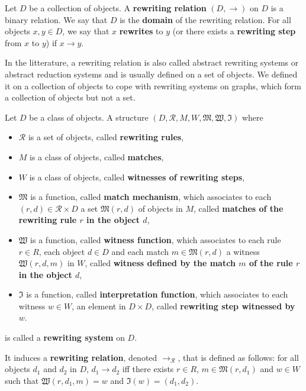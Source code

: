 \begin{definition}
  \label{def:ars}
  Let $D$ be a collection of objects.
  A \textbf{rewriting relation} $(D, \rightarrow)$ on $D$ is a binary relation.
   We say that $D$ is the \textbf{domain} of the rewriting relation. For all objects $x,y\in D$, we say that $x$ \textbf{rewrites} to $y$ (or there exists a \textbf{rewriting step} from $x$ to $y$) if $x \mathop{\rightarrow} y$.
\end{definition}
 
In the litterature, a rewriting relation is also called abstract rewriting systems or abstract reduction systems \cite{nipkow1998term,terese2003term} and is usually defined on a set of objects. We defined it on a collection of objects to cope with rewriting systems on graphs, which form a collection of objects but not a set.
 
\begin{definition}
  \label{def:rewriting_system_no_framework}
  Let $D$ be a class of objects. 
  A structure $(D, \mathcal{R},M,W,\mathfrak{M},\mathfrak{W},\mathfrak{I})$ where 
  \begin{itemize}
    \item $\mathcal{R}$ is a set of objects, called \textbf{rewriting rules}, 
    \item $M$ is a class of objects, called \textbf{matches}, 
    \item $W$ is a class of objects, called \textbf{witnesses of rewriting steps},  
    \item $\mathfrak{M}$ is a function, called \textbf{match mechanism}, which associates to each $(r,d) \mathop{\in} \mathcal{R} \mathop{\times} D$ a set $\mathfrak{M}(r,d)$ of objects in $M$, called \textbf{matches of the rewriting rule $r$ in the object $d$},
    \item $\mathfrak{W}$ is a function, called \textbf{witness function}, which associates to each rule $r \mathop{\in} R$, 
        each object $d \mathop{\in} D$ and each match $m \mathop{\in} \mathfrak{M}(r,d)$ 
        a witness $\mathfrak{W}(r,d,m)$ in $W$, 
        called \textbf{witness defined by the match $m$ of the rule $r$ in the object $d$},
    \item $\mathfrak{I}$ is a function, called \textbf{interpretation function},  
        which associates to each witness $w \mathop{\in} W$, an element 
        in $D \mathop{\times} D$, called \textbf{rewriting step witnessed by $w$}.
  \end{itemize}
   is called a \textbf{rewriting system} on $D$.
   
   It induces a \textbf{rewriting relation}, denoted $\rightarrow_\mathcal{R}$, that is defined as follows: for all objects $d_1$ and $d_2$ in $D$, $d_1 \mathop{\rightarrow} d_2$ iff there exists $r \mathop{\in} R$, $m \mathop{\in} \mathfrak{M}(r,d_1)$ and $w \mathop{\in} W$ such that $\mathfrak{W}(r,d_1,m) \mathop{=} w$ and $\mathfrak{I}(w) \mathop{=} (d_1,d_2)$.
\end{definition}

